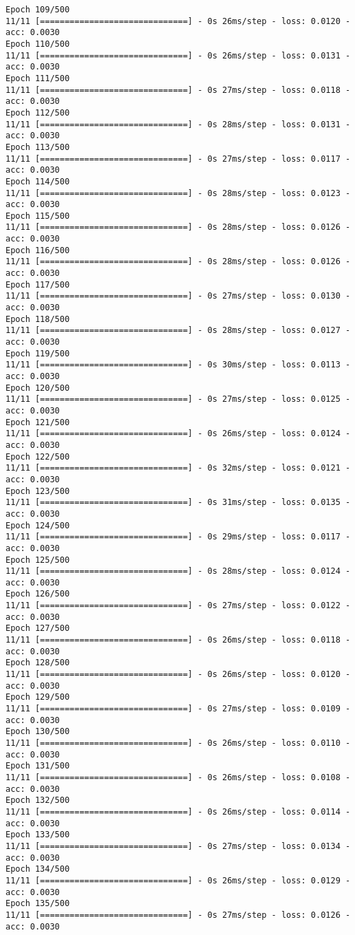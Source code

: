\documentclass[11pt]{article}
\begin{document}
\begin{Verbatim}[commandchars=\\\{\}]
Epoch 109/500
11/11 [==============================] - 0s 26ms/step - loss: 0.0120 - acc: 0.0030
Epoch 110/500
11/11 [==============================] - 0s 26ms/step - loss: 0.0131 - acc: 0.0030
Epoch 111/500
11/11 [==============================] - 0s 27ms/step - loss: 0.0118 - acc: 0.0030
Epoch 112/500
11/11 [==============================] - 0s 28ms/step - loss: 0.0131 - acc: 0.0030
Epoch 113/500
11/11 [==============================] - 0s 27ms/step - loss: 0.0117 - acc: 0.0030
Epoch 114/500
11/11 [==============================] - 0s 28ms/step - loss: 0.0123 - acc: 0.0030
Epoch 115/500
11/11 [==============================] - 0s 28ms/step - loss: 0.0126 - acc: 0.0030
Epoch 116/500
11/11 [==============================] - 0s 28ms/step - loss: 0.0126 - acc: 0.0030
Epoch 117/500
11/11 [==============================] - 0s 27ms/step - loss: 0.0130 - acc: 0.0030
Epoch 118/500
11/11 [==============================] - 0s 28ms/step - loss: 0.0127 - acc: 0.0030
Epoch 119/500
11/11 [==============================] - 0s 30ms/step - loss: 0.0113 - acc: 0.0030
Epoch 120/500
11/11 [==============================] - 0s 27ms/step - loss: 0.0125 - acc: 0.0030
Epoch 121/500
11/11 [==============================] - 0s 26ms/step - loss: 0.0124 - acc: 0.0030
Epoch 122/500
11/11 [==============================] - 0s 32ms/step - loss: 0.0121 - acc: 0.0030
Epoch 123/500
11/11 [==============================] - 0s 31ms/step - loss: 0.0135 - acc: 0.0030
Epoch 124/500
11/11 [==============================] - 0s 29ms/step - loss: 0.0117 - acc: 0.0030
Epoch 125/500
11/11 [==============================] - 0s 28ms/step - loss: 0.0124 - acc: 0.0030
Epoch 126/500
11/11 [==============================] - 0s 27ms/step - loss: 0.0122 - acc: 0.0030
Epoch 127/500
11/11 [==============================] - 0s 26ms/step - loss: 0.0118 - acc: 0.0030
Epoch 128/500
11/11 [==============================] - 0s 26ms/step - loss: 0.0120 - acc: 0.0030
Epoch 129/500
11/11 [==============================] - 0s 27ms/step - loss: 0.0109 - acc: 0.0030
Epoch 130/500
11/11 [==============================] - 0s 26ms/step - loss: 0.0110 - acc: 0.0030
Epoch 131/500
11/11 [==============================] - 0s 26ms/step - loss: 0.0108 - acc: 0.0030
Epoch 132/500
11/11 [==============================] - 0s 26ms/step - loss: 0.0114 - acc: 0.0030
Epoch 133/500
11/11 [==============================] - 0s 27ms/step - loss: 0.0134 - acc: 0.0030
Epoch 134/500
11/11 [==============================] - 0s 26ms/step - loss: 0.0129 - acc: 0.0030
Epoch 135/500
11/11 [==============================] - 0s 27ms/step - loss: 0.0126 - acc: 0.0030

\end{Verbatim}
\end{document}
